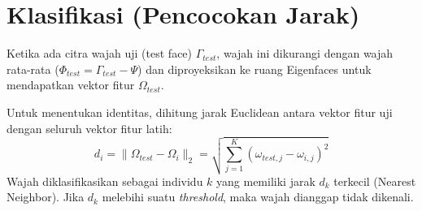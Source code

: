 \documentclass[a4paper,12pt]{article}
\begin{document}
\section{Klasifikasi (Pencocokan Jarak)}
Ketika ada citra wajah uji (test face) $\Gamma_{test}$, wajah ini dikurangi dengan wajah rata-rata ($\Phi_{test} = \Gamma_{test} - \Psi$) dan diproyeksikan ke ruang Eigenfaces untuk mendapatkan vektor fitur $\Omega_{test}$.

Untuk menentukan identitas, dihitung jarak Euclidean antara vektor fitur uji dengan seluruh vektor fitur latih:
\begin{equation}
    d_i = \| \Omega_{test} - \Omega_i \|_2 = \sqrt{\sum_{j=1}^{K} (\omega_{test,j} - \omega_{i,j})^2}
\end{equation}
Wajah diklasifikasikan sebagai individu $k$ yang memiliki jarak $d_k$ terkecil (Nearest Neighbor). Jika $d_k$ melebihi suatu \textit{threshold}, maka wajah dianggap tidak dikenali.
\end{document}
